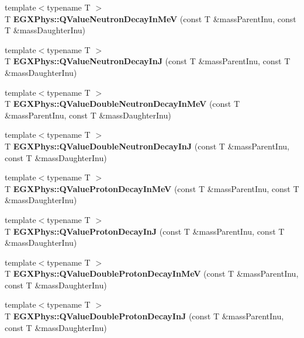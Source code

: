 \begin{DoxyCompactItemize}
\item 
\mbox{\label{group___q_value_gaf854b3ac07909a87f44be4e38ebb0c32}} 
{\footnotesize template$<$typename T $>$ }\\T {\bfseries E\+G\+X\+Phys\+::\+Q\+Value\+Neutron\+Decay\+In\+MeV} (const T \&mass\+Parent\+Inu, const T \&mass\+Daughter\+Inu)
\item 
\mbox{\label{group___q_value_gab9ffbd12c3f814e03f0ed1fbdcba0700}} 
{\footnotesize template$<$typename T $>$ }\\T {\bfseries E\+G\+X\+Phys\+::\+Q\+Value\+Neutron\+Decay\+InJ} (const T \&mass\+Parent\+Inu, const T \&mass\+Daughter\+Inu)
\item 
\mbox{\label{group___q_value_ga6bfea723aca78b32ea67cc1ca7b4031b}} 
{\footnotesize template$<$typename T $>$ }\\T {\bfseries E\+G\+X\+Phys\+::\+Q\+Value\+Double\+Neutron\+Decay\+In\+MeV} (const T \&mass\+Parent\+Inu, const T \&mass\+Daughter\+Inu)
\item 
\mbox{\label{group___q_value_gada1ace2aa0a791df382f120767a56fe9}} 
{\footnotesize template$<$typename T $>$ }\\T {\bfseries E\+G\+X\+Phys\+::\+Q\+Value\+Double\+Neutron\+Decay\+InJ} (const T \&mass\+Parent\+Inu, const T \&mass\+Daughter\+Inu)
\item 
\mbox{\label{group___q_value_ga514354518df3bf1cde561b6d75879ef0}} 
{\footnotesize template$<$typename T $>$ }\\T {\bfseries E\+G\+X\+Phys\+::\+Q\+Value\+Proton\+Decay\+In\+MeV} (const T \&mass\+Parent\+Inu, const T \&mass\+Daughter\+Inu)
\item 
\mbox{\label{group___q_value_gaa344322393356bd442d17c992628218a}} 
{\footnotesize template$<$typename T $>$ }\\T {\bfseries E\+G\+X\+Phys\+::\+Q\+Value\+Proton\+Decay\+InJ} (const T \&mass\+Parent\+Inu, const T \&mass\+Daughter\+Inu)
\item 
\mbox{\label{group___q_value_ga4a57c8901e92918f08bee52493b81c59}} 
{\footnotesize template$<$typename T $>$ }\\T {\bfseries E\+G\+X\+Phys\+::\+Q\+Value\+Double\+Proton\+Decay\+In\+MeV} (const T \&mass\+Parent\+Inu, const T \&mass\+Daughter\+Inu)
\item 
\mbox{\label{group___q_value_ga64a3867f65de5586feab99527bb03d31}} 
{\footnotesize template$<$typename T $>$ }\\T {\bfseries E\+G\+X\+Phys\+::\+Q\+Value\+Double\+Proton\+Decay\+InJ} (const T \&mass\+Parent\+Inu, const T \&mass\+Daughter\+Inu)
\end{DoxyCompactItemize}


